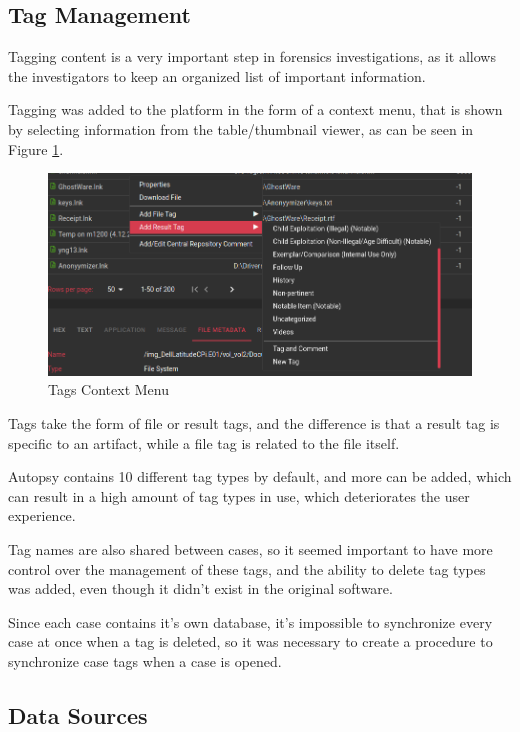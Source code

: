 \subsection{Tag Management}

Tagging content is a very important step in forensics investigations, as it allows the investigators to keep an organized list of important information.

Tagging was added to the platform in the form of a context menu, that is shown by selecting information from the table/thumbnail viewer, as can be seen in Figure \ref{fig:tags}.

\begin{figure}[ht]
 \centering
 \includegraphics[width=1\linewidth]{imgs/tags.png}
 \caption{Tags Context Menu}
 \label{fig:tags}
\end{figure}

Tags take the form of file or result tags, and the difference is that a result tag is specific to an artifact, while a file tag is related to the file itself.

Autopsy contains 10 different tag types by default, and more can be added, which can result in a high amount of tag types in use, which deteriorates the user experience.

Tag names are also shared between cases, so it seemed important to have more control over the management of these tags, and the ability to delete tag types was added, even though it didn't exist in the original software.

Since each case contains it's own database, it's impossible to synchronize every case at once when a tag is deleted, so it was necessary to create a procedure to synchronize case tags when a case is opened.

\subsection{Data Sources}

